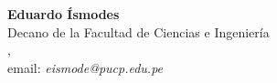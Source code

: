 \begin{center}
\textbf{Eduardo Ísmodes}\\
Decano de la Facultad de Ciencias e Ingeniería\\
\institution, \city\\
email: \textit{eismode@pucp.edu.pe}
\end{center}


